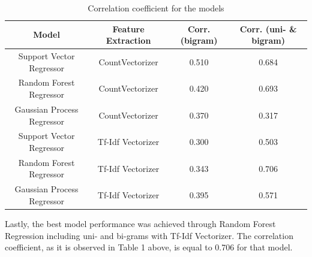\documentclass[a4paper]{article}
\begin{document}
\begin{table}[htbp!]
\begin{tabular}{ |c|c|c|c| } 
 \hline
 Model & Feature Extraction & Corr. (bigram) & Corr. (uni- \& bigram) \\
 \hline
 Support Vector Regressor & CountVectorizer & 0.510 & 0.684 \\ 
 \hline
 Random Forest Regressor & CountVectorizer & 0.420 & 0.693 \\ 
  \hline
 Gaussian Process Regressor & CountVectorizer & 0.370 & 0.317 \\
 \hline
 Support Vector Regressor & Tf-Idf Vectorizer & 0.300 & 0.503 \\ 
 \hline
 Random Forest Regressor & Tf-Idf Vectorizer & 0.343 & \cellcolor[HTML]{EEAB54}0.706 \\ 
  \hline
 Gaussian Process Regressor & Tf-Idf Vectorizer & 0.395 & 0.571 \\
 \hline
\end{tabular}
\caption{Correlation coefficient for the models}
\end{table} 

    Lastly, the best model performance was achieved through Random Forest Regression including uni- and bi-grams with Tf-Idf Vectorizer. The correlation coefficient, as it is observed in Table 1 above, is equal to 0.706 for that model.
\end{document}
